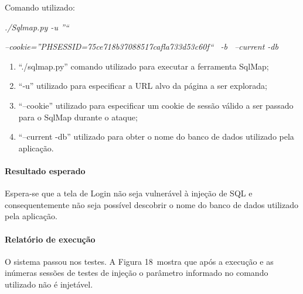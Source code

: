 \documentclass[
    12pt,               %
    openright,          %
    oneside,            %
    a4paper,            %
    section=TITLE,     %
    english,            %
    french,             %
    spanish,            %
    brazil              %
    ]{abntex2}
\begin{document}
Comando utilizado:


\emph{./Sqlmap.py -u ''}\emph{}\emph{`` }


\emph{--cookie=''PHSESSID=75ce718b37088517cafla733d53c60f``~ -b~ --current -db }



\begin{enumerate}[start=1]
	
\item \textquotedblleft{}./sqlmap.py\textquotedblright{} comando utilizado para executar a ferramenta SqlMap;
	
\item \textquotedblleft{}-u\textquotedblright{} utilizado para especificar a URL alvo da página a ser explorada;
	
\item \textquotedblleft{}--cookie\textquotedblright{} utilizado para especificar um cookie de sessão válido a ser passado para o SqlMap durante o ataque;
	
\item \textquotedblleft{}--current -db\textquotedblright{} utilizado para obter o nome do banco de dados utilizado pela aplicação.

\end{enumerate}


\paragraph*{Resultado esperado}

Espera-se que a tela de Login não seja vulnerável à injeção de SQL e consequentemente não seja possível descobrir o nome do banco de dados utilizado pela aplicação.



\paragraph*{Relatório de execução}

O sistema passou nos testes. A Figura 18~mostra que após a execução e as inúmeras sessões de testes de injeção o parâmetro informado no comando utilizado não é injetável.
\end{document}
